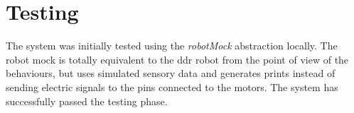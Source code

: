 \section{Testing}
The system was initially tested using the \textit{robotMock} abstraction locally. The robot mock is totally equivalent to the ddr robot from the point of view of the behaviours, but uses simulated sensory data and generates prints instead of sending electric signals to the pins connected to the motors. The system has successfully passed the testing phase.